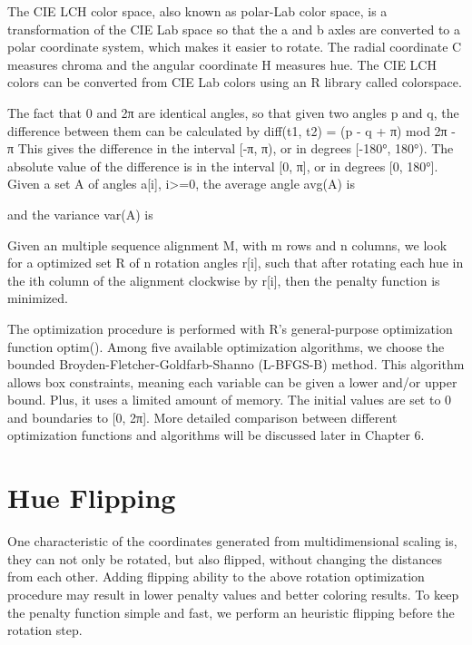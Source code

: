The CIE LCH color space, also known as polar-Lab color space, is a transformation of the CIE Lab space so that the a and b axles are converted to a polar coordinate system, which makes it easier to rotate. The radial coordinate C measures chroma and the angular coordinate H measures hue. The CIE LCH colors can be converted from CIE Lab colors using an R library called colorspace.

The fact that 0 and 2π are identical angles, so that given two angles p and q, the difference between them can be calculated by
diff(t1, t2) = (p - q + π) mod 2π - π
This gives the difference in the interval [-π, π), or in degrees [-180°, 180°). The absolute value of the difference is in the interval [0, π], or in degrees [0, 180°]. Given a set A of angles a[i], i>=0, the average angle avg(A) is


and the variance var(A) is

Given an multiple sequence alignment M, with m rows and n columns, we look for a optimized set R of n rotation angles r[i], such that after rotating each hue in the ith column of the alignment clockwise by r[i], then the penalty function
is minimized.

The optimization procedure is performed with R’s general-purpose optimization function optim(). Among five available optimization algorithms, we choose the bounded Broyden-Fletcher-Goldfarb-Shanno (L-BFGS-B) method. This algorithm allows box constraints, meaning each variable can be given a lower and/or upper bound. Plus, it uses a limited amount of memory. The initial values are set to 0 and boundaries to [0, 2π]. More detailed comparison between different optimization functions and algorithms will be discussed later in Chapter 6.

\section{Hue Flipping}

One characteristic of the coordinates generated from multidimensional scaling is, they can not only be rotated, but also flipped, without changing the distances from each other. Adding flipping ability to the above rotation optimization procedure may result in lower penalty values and better coloring results. To keep the penalty function simple and fast, we perform an heuristic flipping before the rotation step.

